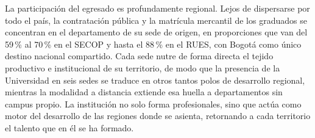 \begin{cajahallazgo}
La participación del egresado es profundamente regional. Lejos de dispersarse por todo el país, la contratación pública y la matrícula mercantil de los graduados se concentran en el departamento de su sede de origen, en proporciones que van del 59\,\% al 70\,\% en el SECOP y hasta el 88\,\% en el RUES, con Bogotá como único destino nacional compartido. Cada sede nutre de forma directa el tejido productivo e institucional de su territorio, de modo que la presencia de la Universidad en seis sedes se traduce en otros tantos polos de desarrollo regional, mientras la modalidad a distancia extiende esa huella a departamentos sin campus propio. La institución no solo forma profesionales, sino que actúa como motor del desarrollo de las regiones donde se asienta, retornando a cada territorio el talento que en él se ha formado.
\end{cajahallazgo}
